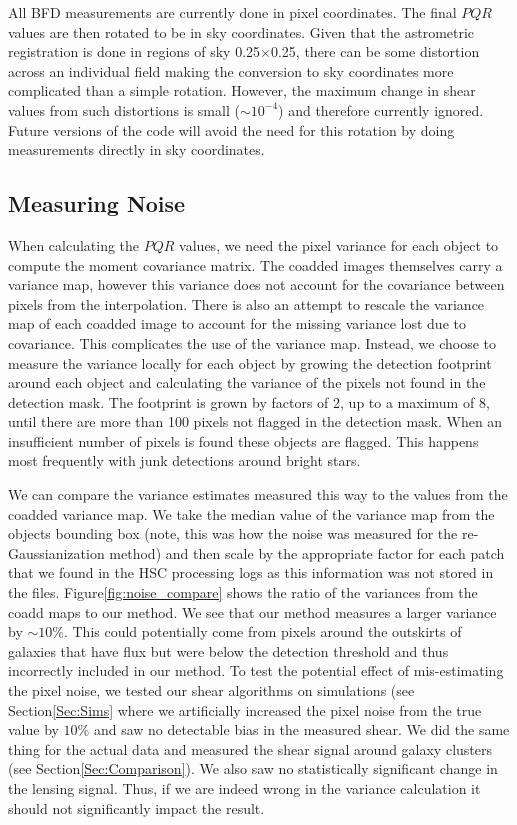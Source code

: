 \documentclass[useAMS,usenatbib]{mnras}
\begin{document}
All BFD measurements are currently done in pixel coordinates.  The final $PQR$ values are then rotated to be in sky coordinates.  Given that the astrometric registration is done in regions of sky 0.25\arcmin$\times$0.25\arcmin, there can be some distortion across an individual field making the conversion to sky coordinates more complicated than a simple rotation.  However, the maximum change in shear values from such distortions is small ($\sim 10^{-4}$) and therefore currently ignored.  Future versions of the code will avoid the need for this rotation by doing measurements directly in sky coordinates.

\subsection{Measuring Noise}
\label{Sec:Noise}
When calculating the $PQR$ values, we need the pixel variance for each object to compute the moment covariance matrix.  The coadded images themselves carry a variance map, however this variance does not account for the covariance between pixels from the interpolation.  There is also an attempt to rescale the variance map of each coadded image to account for the missing variance lost due to covariance.  This complicates the use of the variance map.  Instead, we choose to measure the variance locally for each object by growing the detection footprint around each object and calculating the variance of the pixels not found in the detection mask.  The footprint is grown by factors of 2, up to a maximum of 8, until there are more than 100 pixels not flagged in the detection mask.  When an insufficient number of pixels is found these objects are flagged.  This happens most frequently with junk detections around bright stars.

We can compare the variance estimates measured this way to the values from the coadded variance map.  We take the median value of the variance map from the objects bounding box (note, this was how the noise was measured for the re-Gaussianization method) and then scale by the appropriate factor for each patch that we found in the HSC processing logs as this information was not stored in the files.  Figure\ref{fig:noise_compare} shows the ratio of the variances from the coadd maps to our method.  We see that our method measures a larger variance by $\sim10\%$.  This could potentially come from pixels around the outskirts of galaxies that have flux but were below the detection threshold and thus incorrectly included in our method.  To test the potential effect of mis-estimating the pixel noise, we tested our shear algorithms on simulations (see Section\ref{Sec:Sims} where we artificially increased the pixel noise from the true value by $10\%$ and saw no detectable bias in the measured shear.  We did the same thing for the actual data and measured the shear signal around galaxy clusters (see Section\ref{Sec:Comparison}).  We also saw no statistically significant change in the lensing signal.  Thus, if we are indeed wrong in the variance calculation it should not significantly impact the result.
\end{document}
